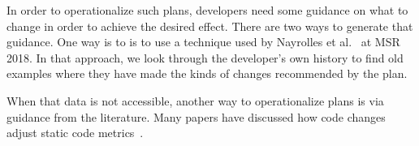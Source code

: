 \documentclass[smallextended]{svjour3}       %
\begin{document}
In order to operationalize such plans, developers need some guidance on what to change in order to achieve the desired effect. 
There are two ways to generate that guidance.
One way is to is to use a technique
used by Nayrolles et al.~\cite{nayrolles2018clever} at MSR 2018. In that approach, we look through the developer's own history to find old examples where they have made the kinds of changes recommended by the plan. 

When that data is not accessible, another way to operationalize plans is via 
 guidance from the literature. Many papers have
discussed how code changes adjust
static code metrics~\cite{stroggylos2007, du2006study, kataoka2002, bryton2009, elish2011, elish2012}.
\end{document}
